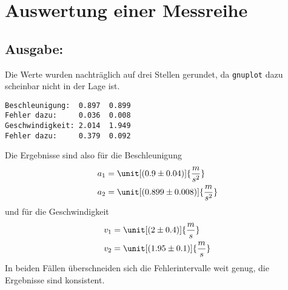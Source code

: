 \section{Auswertung einer Messreihe}



\subsection*{Ausgabe:}
Die Werte wurden nachträglich auf drei Stellen gerundet, da \verb'gnuplot' dazu
scheinbar nicht in der Lage ist.
\begin{lstlisting}
Beschleunigung:  0.897  0.899
Fehler dazu:     0.036  0.008
Geschwindigkeit: 2.014  1.949
Fehler dazu:     0.379  0.092
\end{lstlisting}
Die Ergebnisse sind also für die Beschleunigung
\begin{align*}
    a_1 &= \unit[(0.9 \pm 0.04)]{\frac{m}{s^2}} \\
    a_2 &= \unit[(0.899 \pm 0.008)]{\frac{m}{s^2}}
\end{align*}
und für die Geschwindigkeit
\begin{align*}
    v_1 &= \unit[(2 \pm 0.4)]{\frac{m}{s}} \\
    v_2 &= \unit[(1.95 \pm 0.1)]{\frac{m}{s}}
\end{align*}
In beiden Fällen überschneiden sich die Fehlerintervalle weit genug, die
Ergebnisse sind konsistent.

